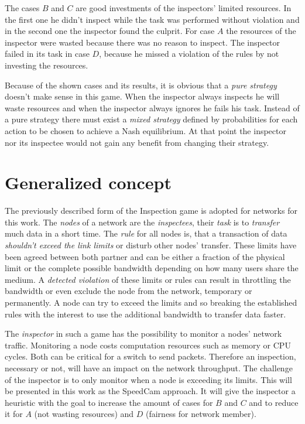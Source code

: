 \documentclass[thesis.tex]{subfiles}
\begin{document}
The cases $B$ and $C$ are good investments of the inspectors' limited resources. In the first one he didn't inspect while the task was performed without violation and in the second one the inspector found the culprit. For case $A$ the resources of the inspector were wasted because there was no reason to inspect. The inspector failed in its task in case $D$, because he missed a violation of the rules by not investing the resources.

Because of the shown cases and its results, it is obvious that a \textit{pure strategy} doesn't make sense in this game. When the inspector always inspects he will waste resources and when the inspector always ignores he fails his task. Instead of a pure strategy there must exist a \textit{mixed strategy} defined by probabilities for each action to be chosen to achieve a Nash equilibrium. At that point the inspector nor its inspectee would not gain any benefit from changing their strategy.\cite{nash1950equilibrium}


\section {Generalized concept} \label{sec:main:generalconcept}
The previously described form of the Inspection game is adopted for networks for this work. The \textit{nodes} of a network are the \textit{inspectees}, their \textit{task} is to \textit{transfer} much data in a short time. The \textit{rule} for all nodes is, that a transaction of data \textit{shouldn't exceed the link limits} or disturb other nodes' transfer. These limits have been agreed between both partner and can be either a fraction of the physical limit or the complete possible bandwidth depending on how many users share the medium. A \textit{detected violation} of these limits or rules can result in throttling the bandwidth or even exclude the node from the network, temporary or permanently. A node can try to exceed the limits and so breaking the established rules with the interest to use the additional bandwidth to transfer data faster.

The \textit{inspector} in such a game has the possibility to monitor a nodes' network traffic. Monitoring a node costs computation resources such as memory or CPU cycles. Both can be critical for a switch to send packets. Therefore an inspection, necessary or not, will have an impact on the network throughput. The challenge of the inspector is to only monitor when a node is exceeding its limits. This will be presented in this work as the SpeedCam approach. It will give the inspector a heuristic with the goal to increase the amount of cases for $B$ and $C$ and to reduce it for $A$ (not wasting resources) and $D$ (fairness for network member).
\end{document}

